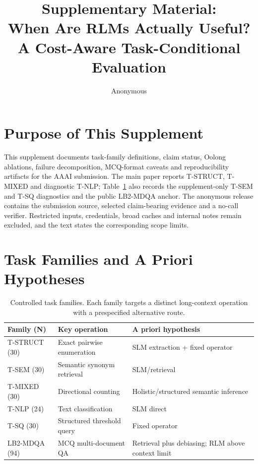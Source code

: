 \documentclass[letterpaper]{article}
\title{Supplementary Material:\\When Are RLMs Actually Useful?\\
A Cost-Aware Task-Conditional Evaluation}
\author{Anonymous}
\begin{document}
\raggedbottom
\maketitle

\section{Purpose of This Supplement}

This supplement documents task-family definitions, claim status, Oolong ablations, failure decomposition, MCQ-format caveats and reproducibility artifacts for the AAAI submission. The main paper reports T-STRUCT, T-MIXED and diagnostic T-NLP; Table~\ref{tab:supp-tasks} also records the supplement-only T-SEM and T-SQ diagnostics and the public LB2-MDQA anchor. The anonymous release contains the submission source, selected claim-bearing evidence and a no-call verifier. Restricted inputs, credentials, broad caches and internal notes remain excluded, and the text states the corresponding scope limits.

\section{Task Families and A Priori Hypotheses}

\begin{table}[!htbp]
\centering
\small
\setlength{\tabcolsep}{3pt}
\begin{tabular}{@{}p{1.45cm}p{2.15cm}p{3.1cm}@{}}
\toprule
\textbf{Family (N)} & \textbf{Key operation} & \textbf{A priori hypothesis} \\
\midrule
T-STRUCT (30) & Exact pairwise enumeration & SLM extraction + fixed operator \\
T-SEM (30) & Semantic synonym retrieval & SLM/retrieval \\
T-MIXED (30) & Directional counting & Holistic/structured semantic inference \\
T-NLP (24) & Text classification & SLM direct \\
T-SQ (30) & Structured threshold query & Fixed operator \\
LB2-MDQA (94) & MCQ multi-document QA & Retrieval plus debiasing; RLM above context limit \\
\bottomrule
\end{tabular}
\caption{Controlled task families. Each family targets a distinct long-context operation with a prespecified alternative route.}
\label{tab:supp-tasks}
\end{table}
\end{document}
